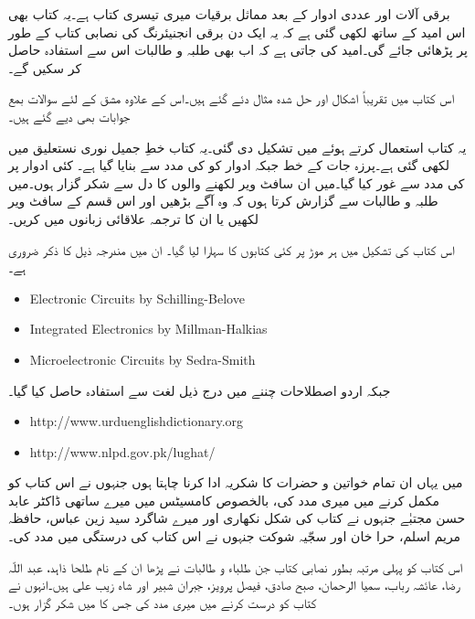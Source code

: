 \thispagestyle{empty}
برقی آلات اور عددی ادوار کے بعد مماثل برقیات میری تیسری کتاب ہے۔یہ کتاب بھی اس امید کے ساتھ لکھی گئی ہے کہ یہ ایک دن برقی انجنیئرنگ کی نصابی کتاب کے طور پر پڑھائی جائے گی۔امید کی جاتی ہے کہ اب بھی طلبہ و طالبات اس سے استفادہ حاصل کر سکیں گے۔

اس کتاب میں تقریباً  اشکال اور  حل شدہ مثال دئے گئے ہیں۔اس کے علاوہ  مشق کے لئے   سوالات  بمع جوابات بھی دیے گئے ہیں۔

یہ کتاب  استعمال  کرتے ہوئے  میں تشکیل دی گئی۔یہ کتاب خطِ جمیل نوری نستعلیق میں لکھی گئی ہے۔پرزہ جات کے خط  جبکہ ادوار کو  کی مدد سے بنایا گیا ہے۔ کئی ادوار پر  کی مدد سے غور کیا گیا۔میں ان سافٹ ویر لکھنے والوں کا دل سے شکر گزار ہوں۔میں طلبہ و طالبات سے گزارش  کرتا ہوں کہ وہ آگے بڑھیں اور اس قسم کے سافٹ ویر لکھیں یا ان کا ترجمہ علاقائی زبانوں میں کریں۔

اس کتاب کی تشکیل میں ہر موڑ پر کئی کتابوں کا سہارا لیا گیا۔ ان میں مندرجہ ذیل کا ذکر ضروری ہے۔
{
\begin{otherlanguage}{english}
\begin{itemize}
\item
Electronic Circuits by Schilling-Belove
\item
Integrated Electronics by Millman-Halkias
\item
Microelectronic Circuits by Sedra-Smith
\end{itemize}
\end{otherlanguage}
}

جبکہ اردو اصطلاحات چننے میں درج ذیل لغت سے استفادہ حاصل کیا گیا۔
{
\begin{otherlanguage}{english}
\begin{itemize}
\item
http:/\!\!/www.urduenglishdictionary.org
\item
http:/\!\!/www.nlpd.gov.pk/lughat/
\end{itemize}
\end{otherlanguage}
}


میں یہاں ان تمام خواتین و حضرات کا شکریہ ادا کرنا چاہتا ہوں جنہوں نے اس کتاب کو مکمل کرنے میں میری مدد کی، بالخصوص کامسیٹس میں میرے ساتھی ڈاکٹر عابد حسن مجتبٰے جنہوں نے کتاب کی شکل نکھاری اور میرے شاگرد سید زین عباس، حافظہ مریم اسلم، حرا خان اور  سجّیہ شوکت  جنہوں نے اس کتاب کی درستگی میں مدد کی۔ 

اس کتاب کو پہلی مرتبہ بطور نصابی کتاب جن طلباء و طالبات نے پڑھا ان کے نام طلحا ذاہد، عبد اللّہ رضا، عائشہ رباب، سمیا الرحمان، صبح صادق، فیصل پرویز، جبران شبیر اور شاہ زیب علی ہیں۔انہوں نے کتاب کو درست کرنے میں میری مدد کی جس کا میں شکر گزار ہوں۔


